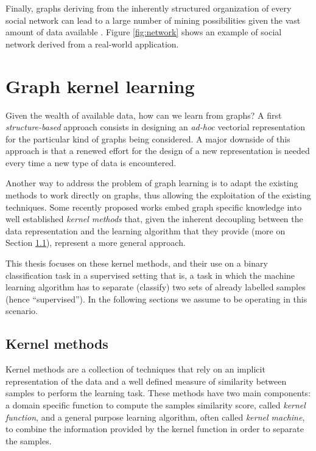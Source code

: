 Finally, graphs deriving from the inherently structured organization of every social
network can lead to a large number of mining possibilities given the vast
amount of data available \cite{gundecha2012mining}.
Figure \ref{fig:network} shows an example of social network derived from a real-world
application.


\section{Graph kernel learning}

Given the wealth of available data, how can we learn from graphs? A first \emph{structure-based}
approach consists in designing an \emph{ad-hoc} vectorial representation for the
particular kind of graphs being considered.
A major downside of this approach is that a renewed effort for the 
design of a new representation is needed every time a new type of data
is encountered.

Another way to address the problem of graph learning is to adapt the existing methods
to work directly on graphs, thus allowing the exploitation of the existing techniques.
Some recently proposed works \cite{DBLP:conf/sdm/MartinoNS12, NIPS2009_3813}
embed graph specific knowledge into well established \emph{kernel methods}
that, given the inherent decoupling between the data representation and the learning
algorithm that they provide (more on Section \ref{subsec:introkm}), represent a
more general approach.

This thesis focuses on these kernel methods, and their use on a binary classification
task in a supervised setting that is, a task in which the machine learning algorithm
has to separate (classify) two sets of already labelled samples (hence ``supervised'').
In the following sections we assume to be operating in this scenario.

\subsection{Kernel methods}
\label{subsec:introkm}

Kernel methods are a collection of techniques that rely on an implicit representation
of the data and a well defined measure of similarity between samples to perform
the learning task.
These methods have two main components: a domain specific function to compute the
samples similarity score, called \emph{kernel function}, and a general purpose
learning algorithm, often called \emph{kernel machine}, to combine the information provided by the
kernel function in order to separate the samples.


